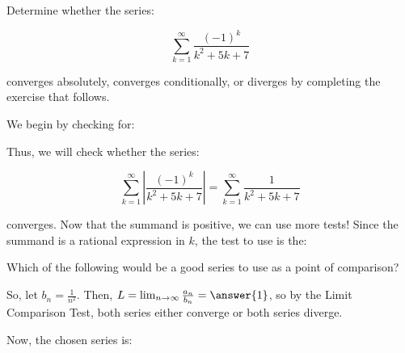 \documentclass{ximera}
\author{Jim Talamo}
\begin{document}
\begin{exercise}

Determine whether the series:

\[
\sum_{k=1}^{\infty} \frac{(-1)^k}{k^2+5k+7}
\]

converges absolutely, converges conditionally, or diverges by completing the exercise that follows.

We begin by checking for:

\begin{multipleChoice}
\end{multipleChoice}

Thus, we will check whether the series:

\[
\sum_{k=1}^{\infty} \left|  \frac{(-1)^k}{k^2+5k+7} \right| = \sum_{k=1}^{\infty} \frac{1}{k^2+5k+7}
\]

converges.  Now that the summand is positive, we can use more tests!  Since the summand is a rational expression in $k$, the test to use is the:
\begin{multipleChoice}
\end{multipleChoice}

\begin{exercise}
Which of the following would be a good series to use as a point of comparison?

\begin{multipleChoice}
\end{multipleChoice}

So, let $b_n = \frac{1}{n^2}$.  Then, $L = \lim_{n \to \infty} \frac{a_n}{b_n} = \answer{1}$, so by the Limit Comparison Test, both series either converge or both series diverge.

Now, the chosen series is:
\begin{multipleChoice}
\end{multipleChoice}


\end{exercise}
\end{exercise}
\end{document}
